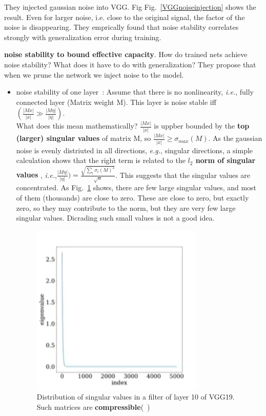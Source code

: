 \documentclass{article} %
\newcommand{\figref}[1]{Fig.~\ref{#1}}
\newcommand{\eg}{\emph{e.g.},\xspace}
\newcommand{\ie}{\emph{i.e.},\xspace}
\newcommand\fakeparagraph[1]{\par\noindent\textbf{{#1}}.\xspace}
\begin{document}
They injected gaussian noise into VGG. Fig \figref{VGGnoiseinjection} shows the result. Even for larger noise, i.e. close to the original signal, the factor of the noise is disappearing. They emprically found that noise stability correlates strongly with generalization error during training.
\fakeparagraph{noise stability to bound effective capacity} How do trained nets achieve noise stability? What does it have to do with generalization? They propose that when we prune the network we inject noise to the model.
\begin{itemize}
\item noise stability of one layer~\cite{aroraicml18}: Assume that there is no nonlinearity, \ie fully connected layer (Matrix weight M). This layer is noise stable iff $(\frac{|Mx|}{|x|} \gg \frac{|M\eta|}{|\eta|})$. \\
What does this mean mathematically? $\frac{|Mx|}{|x|}$ is uppber bounded by the \textbf{top (larger) singular values}  of matrix M, so $\frac{|Mx|}{|x|}\geq \sigma_{max}(M)$. As the gaussian noise is evenly distriuted in all directions, \eg singular directions, a simple calculation shows that the right term is related to the \textbf{$l_2$ norm of singular values} , \ie $\frac{|M\eta|}{|\eta|}) = \frac{\sqrt{\sum_{i} \sigma_i(M)^2}}{\sqrt{n}}$. This suggests that the singular values are concentrated. As \figref{SVdistrubition_vgg} shows, there are few large singular values, and most of them (thousands) are close to zero. These are close to zero, but exactly zero, so they may contribute to the norm, but they are very few large singular values. Dicrading such small values is not a good idea.

\begin{figure}[h]
\begin{center}
\includegraphics[width=0.3\columnwidth]{pix/SVdistributionVGG.png}
\caption{Distribution of singular values in a filter of layer 10 of VGG19. Such matrices are \textbf{compressible}(~\cite{aroraicml18})}
\end{center}
\label{SVdistrubition_vgg}
\end{figure}


\end{itemize}
\end{document}
